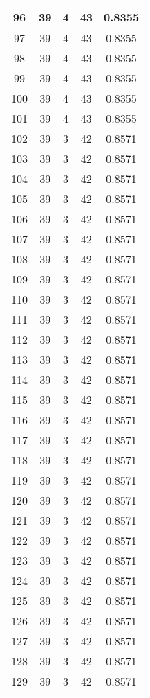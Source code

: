 \documentclass[letterpaper, 12pt]{article}
\begin{document}
\begin{longtable}{|c|c|c|c|c|}
\hline
96 & 39 & 4 & 43 & 0.8355 \\
\hline
97 & 39 & 4 & 43 & 0.8355 \\
\hline
98 & 39 & 4 & 43 & 0.8355 \\
\hline
99 & 39 & 4 & 43 & 0.8355 \\
\hline
100 & 39 & 4 & 43 & 0.8355 \\
\hline
101 & 39 & 4 & 43 & 0.8355 \\
\hline
102 & 39 & 3 & 42 & 0.8571 \\
\hline
103 & 39 & 3 & 42 & 0.8571 \\
\hline
104 & 39 & 3 & 42 & 0.8571 \\
\hline
105 & 39 & 3 & 42 & 0.8571 \\
\hline
106 & 39 & 3 & 42 & 0.8571 \\
\hline
107 & 39 & 3 & 42 & 0.8571 \\
\hline
108 & 39 & 3 & 42 & 0.8571 \\
\hline
109 & 39 & 3 & 42 & 0.8571 \\
\hline
110 & 39 & 3 & 42 & 0.8571 \\
\hline
111 & 39 & 3 & 42 & 0.8571 \\
\hline
112 & 39 & 3 & 42 & 0.8571 \\
\hline
113 & 39 & 3 & 42 & 0.8571 \\
\hline
114 & 39 & 3 & 42 & 0.8571 \\
\hline
115 & 39 & 3 & 42 & 0.8571 \\
\hline
116 & 39 & 3 & 42 & 0.8571 \\
\hline
117 & 39 & 3 & 42 & 0.8571 \\
\hline
118 & 39 & 3 & 42 & 0.8571 \\
\hline
119 & 39 & 3 & 42 & 0.8571 \\
\hline
120 & 39 & 3 & 42 & 0.8571 \\
\hline
121 & 39 & 3 & 42 & 0.8571 \\
\hline
122 & 39 & 3 & 42 & 0.8571 \\
\hline
123 & 39 & 3 & 42 & 0.8571 \\
\hline
124 & 39 & 3 & 42 & 0.8571 \\
\hline
125 & 39 & 3 & 42 & 0.8571 \\
\hline
126 & 39 & 3 & 42 & 0.8571 \\
\hline
127 & 39 & 3 & 42 & 0.8571 \\
\hline
128 & 39 & 3 & 42 & 0.8571 \\
\hline
129 & 39 & 3 & 42 & 0.8571 \\

\end{longtable}
\end{document}
